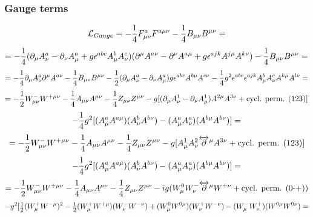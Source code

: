 \subsubsection{Gauge terms}

\begin{equation*}
  {\mathcal L}_{Gauge} = -{1\over4}F^a_{\mu\nu}F^{a\mu\nu} -{1\over4}B_{\mu\nu}B^{\mu\nu}=
\end{equation*}
\begin{equation*}
  = -{1\over4}(\partial_\mu A^a_\nu-\partial_\nu A^a_\mu+g\epsilon^{abc} A^b_\mu A^c_\nu)(\partial^\mu A^{a\nu}-\partial^\nu A^{a\mu}+g\epsilon^{ajk} A^{j\mu} A^{k\nu}) -{1\over4}B_{\mu\nu}B^{\mu\nu}=
\end{equation*}
\begin{equation*}
  = -{1\over4}\partial_\mu A^a_\nu\partial^\mu A^{a\nu} -{1\over4}B_{\mu\nu}B^{\mu\nu} -{1\over2}(\partial_\mu A^a_\nu-\partial_\nu A^a_\mu)g\epsilon^{abc} A^{b\mu} A^{c\nu} -{1\over4}g^2\epsilon^{abc}\epsilon^{ajk}A^b_\mu A^c_\nu A^{k\mu} A^{l\nu} =
\end{equation*}
\begin{equation*}
  = -{1\over2}W^-_{\mu\nu}W^{+\mu\nu} -{1\over4}A_{\mu\nu}A^{\mu\nu} -{1\over4}Z_{\mu\nu}Z^{\mu\nu} -g[(\partial_\mu A^1_\nu-\partial_\nu A^1_\mu)A^{2\mu}A^{3\nu}+ \hbox{cycl. perm. (123)}]
\end{equation*}
\begin{equation*}
  -{1\over4}g^2[(A^a_\mu A^{a\mu})(A^b_\nu A^{b\nu})- (A^a_\mu A^a_\nu)(A^{b\mu} A^{b\nu})]=
\end{equation*}
\begin{equation*}
  = -{1\over2}W^-_{\mu\nu}W^{+\mu\nu} -{1\over4}A_{\mu\nu}A^{\mu\nu} -{1\over4}Z_{\mu\nu}Z^{\mu\nu} -g[A^1_\mu A^2_\nu \overleftrightarrow\partial^\mu A^{3\nu}+ \hbox{cycl. perm. (123)}]
\end{equation*}
\begin{equation*}
  -{1\over4}g^2[(A^a_\mu A^{a\mu})(A^b_\nu A^{b\nu})- (A^a_\mu A^a_\nu)(A^{b\mu} A^{b\nu})] =
\end{equation*}
\begin{equation*}
  = -{1\over2}W^-_{\mu\nu}W^{+\mu\nu} -{1\over4}A_{\mu\nu}A^{\mu\nu} -{1\over4}Z_{\mu\nu}Z^{\mu\nu} -ig(W^0_\mu W^-_\nu\overleftrightarrow\partial^\mu W^{+\nu}+ \hbox{cycl. perm. (0-+)})
\end{equation*}
\begin{equation*}
  -g^2[ {\textstyle{1\over2}}(W^+_\mu W^{-\mu})^2 -{\textstyle{1\over2}}(W^+_\mu W^{+\mu})(W^-_\nu W^{-\nu}) +(W^0_\mu W^{0\mu})(W^+_\nu W^{-\nu}) -(W^-_\mu W^+_\nu)(W^{0\mu} W^{0\nu})=
\end{equation*}
